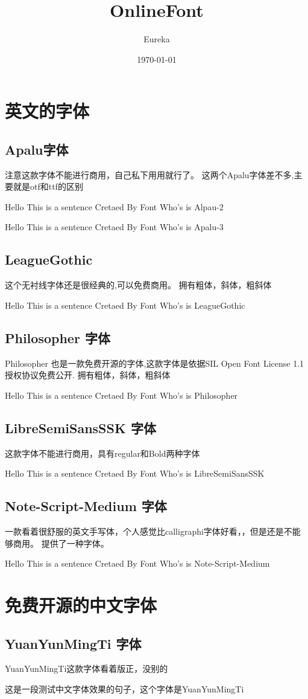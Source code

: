 \documentclass[fontset=windows, 12pt]{article}
\title{OnlineFont}
\author{Eureka}
\date{\today}
\newcommand{\Testsentence}[1]{Hello This is a sentence Cretaed By Font Who's is #1}
\begin{document}
\maketitle

\section{英文的字体}
\subsection{Apalu字体}

    注意这款字体不能进行商用，自己私下用用就行了。
    这两个Apalu字体差不多,主要就是otf和ttf的区别

    {\Apalu \Testsentence{Alpau-2}}

    {\ApalU \Testsentence{Apalu-3}}

\subsection{LeagueGothic}
    这个无衬线字体还是很经典的,可以免费商用。
    拥有粗体，斜体，粗斜体

    {\LeagueGothic \Testsentence{LeagueGothic}} 

\subsection{Philosopher 字体}
    Philosopher 也是一款免费开源的字体,这款字体是依据SIL Open Font License 1.1授权协议免费公开.
    拥有粗体，斜体，粗斜体

    {\Philosopher \Testsentence{Philosopher}}


\subsection{LibreSemiSansSSK 字体}
    这款字体不能进行商用，具有regular和Bold两种字体

    {\LibreSemiSansSSK \Testsentence{LibreSemiSansSSK}}

\subsection{Note-Script-Medium 字体}
    一款看着很舒服的英文手写体，个人感觉比calligraphi字体好看，，但是还是不能够商用。
    提供了一种字体。

    {\NoteScriptMedium \Testsentence{Note-Script-Medium}}


\section{免费开源的中文字体}
\subsection{YuanYunMingTi 字体}
    YuanYunMingTi这款字体看着版正，没别的


    { 这是一段测试中文字体效果的句子，这个字体是YuanYunMingTi}
\end{document}
